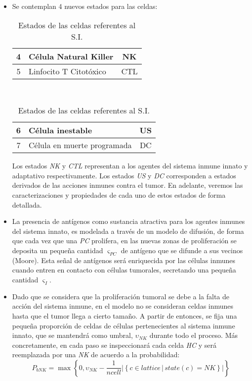 \begin{itemize}
    \item Se contemplan 4 nuevos estados para las celdas: 
 
  \begin{table}[H]
	\centering 
    \renewcommand{\arraystretch}{1.2}
         \begin{tabular}{|c|m{5cm}|c|}  \hline
 			4 & Célula Natural Killer & NK\\ \hline
 		    5 & Linfocito T Citotóxico & CTL\\ \hline
		\end{tabular} \,
		\begin{tabular}{|c|m{5cm}|c|}  \hline
			6 & Célula inestable & US \\ \hline
			7 & Célula en muerte programada & DC \\ \hline
		\end{tabular} 
	\caption{Estados de las celdas referentes al S.I.}
	\label{table:estadosSI}
\end{table}

Los estados \textit{NK} y \textit{CTL} representan a los agentes del sistema inmune innato y adaptativo respectivamente. Los estados \textit{US} y \textit{DC} corresponden a estados derivados de las acciones inmunes contra el tumor. En adelante, veremos las caracterizaciones y propiedades de cada uno de estos estados de forma detallada.\\

\item La presencia de antígenos como sustancia atractiva para los agentes inmunes del sistema innato, es modelada a través de un modelo de difusión, de forma que cada vez que una \textit{PC} prolifera, en las nuevas zonas de proliferación se deposita un pequeña cantidad $\varsigma_{PC}$ de antígeno que se difunde a sus vecinos (Moore). Esta señal de antígenos será enriquecida por las células inmunes cuando entren en contacto con células tumorales, secretando una pequeña cantidad $\varsigma_{I}$.\\

\item Dado que se considera que la proliferación tumoral se debe a la falta de acción del sistema inmune, en el modelo no se consideran celdas inmunes hasta que el tumor llega a cierto tamaño. A partir de entonces, se fija una pequeña proporción de celdas de células pertenecientes al sistema inmune innato, que se mantendrá como umbral, $\upsilon_{NK}$ durante todo el proceso. Más concretamente, en cada paso se inspeccionará cada celda \textit{HC} y será reemplazada por una \textit{NK} de acuerdo a la probabilidad: 
\begin{equation}
    P_{bNK} = \max \left\lbrace 0, \upsilon_{NK} - \frac{1}{\textit{ncell}} \left\vert \left\lbrace c \in \textit{lattice} \, \vert \, state(c) = \textit{NK} \right\rbrace \right\vert \right\rbrace 
\end{equation}


\end{itemize}
